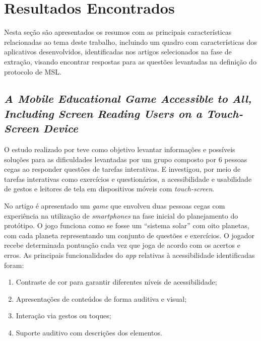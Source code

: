 \newpage{}

\section{Resultados Encontrados}

Nesta seção são apresentados os resumos com as principais características relacionadas ao tema deste trabalho,
incluindo um quadro com características dos aplicativos desenvolvidos, identificadas nos artigos selecionados
na fase de extração, visando encontrar respostas para as questões levantadas na definição do protocolo de MSL\@.

\subsection{\emph{A Mobile Educational Game Accessible to All, Including Screen Reading Users on a Touch-Screen Device}}

O estudo realizado por  teve como objetivo levantar informações e possíveis soluções para as dificuldades levantadas por um grupo composto por 6 pessoas cegas ao responder questões de tarefas interativas.
E investigou, por meio de tarefas interativas como exercícios e questionários, a acessibilidade e usabilidade de gestos e leitores de tela em dispositivos móveis com \emph{touch-screen}.

No artigo é apresentado um \emph{game} que envolveu duas pessoas cegas com experiência na utilização de \emph{smartphones} na fase inicial do planejamento do protótipo.
O jogo funciona como se fosse um ``sistema solar'' com oito planetas, com cada planeta representando um conjunto de questões e exercícios.
O jogador recebe determinada pontuação cada vez que joga de acordo com os acertos e erros.
As principais funcionalidades do \emph{app} relativas à acessibilidade identificadas foram:

\begin{enumerate}
  \item Contraste de cor para garantir diferentes níveis de acessibilidade;
  \item Apresentações de conteúdos de forma auditiva e visual;
  \item Interação via gestos ou toques;
  \item Suporte auditivo com descrições dos elementos.
\end{enumerate}

